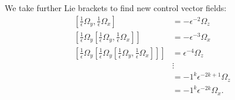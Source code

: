 \documentclass[letter paper, 10pt, conference]{ieeeconf}
\begin{document}
We take further Lie brackets to find new control vector fields:
\begin{align*}
\left[ \frac{1}{\epsilon} \Omega_y, \frac{1}{\epsilon} \Omega_x\right] 
&= -\epsilon^{-2} \Omega_z\\
 \left[\frac{1}{\epsilon} \Omega_y \left[ \frac{1}{\epsilon} \Omega_y, \frac{1}{\epsilon} \Omega_x\right] \right] &= -\epsilon^{-3}\Omega_x\\
\left[\frac{1}{\epsilon} \Omega_y \left[\frac{1}{\epsilon} \Omega_y \left[ \frac{1}{\epsilon} \Omega_y, \frac{1}{\epsilon} \Omega_x\right] \right]\right]&= \epsilon^{-4}\Omega_z\\
&\vdots\\
&= -1^{k} \epsilon^{-2k+1}\Omega_z \\
&= -1^{k} \epsilon^{-2k}\Omega_x.
\end{align*}   %
\end{document}
